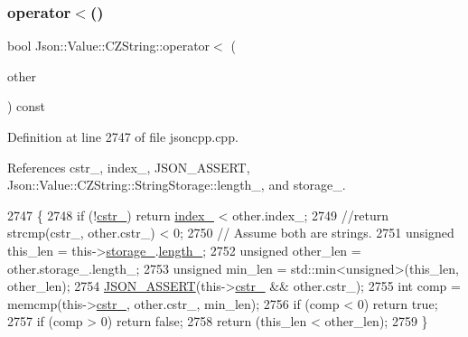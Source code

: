 \subsubsection{\texorpdfstring{operator$<$()}{operator<()}}
{\footnotesize\ttfamily bool Json\+::\+Value\+::\+C\+Z\+String\+::operator$<$ (\begin{DoxyParamCaption}\item[{\hyperlink{class_json_1_1_value_1_1_c_z_string}{C\+Z\+String} const \&}]{other }\end{DoxyParamCaption}) const}



Definition at line 2747 of file jsoncpp.\+cpp.



References cstr\+\_\+, index\+\_\+, J\+S\+O\+N\+\_\+\+A\+S\+S\+E\+RT, Json\+::\+Value\+::\+C\+Z\+String\+::\+String\+Storage\+::length\+\_\+, and storage\+\_\+.


\begin{DoxyCode}
2747                                                          \{
2748   \textcolor{keywordflow}{if} (!\hyperlink{class_json_1_1_value_1_1_c_z_string_a5b4d28349294034d7f779c3c95d0306c}{cstr\_}) \textcolor{keywordflow}{return} \hyperlink{class_json_1_1_value_1_1_c_z_string_aecf29982235c9c165a0971023ebbb270}{index\_} < other.index\_;
2749   \textcolor{comment}{//return strcmp(cstr\_, other.cstr\_) < 0;}
2750   \textcolor{comment}{// Assume both are strings.}
2751   \textcolor{keywordtype}{unsigned} this\_len = this->\hyperlink{class_json_1_1_value_1_1_c_z_string_a17c92f0f089a4314e3b1d5695dc1a851}{storage\_}.\hyperlink{struct_json_1_1_value_1_1_c_z_string_1_1_string_storage_a165d865c44e6471d34668eeb4f15b140}{length\_};
2752   \textcolor{keywordtype}{unsigned} other\_len = other.storage\_.length\_;
2753   \textcolor{keywordtype}{unsigned} min\_len = std::min<unsigned>(this\_len, other\_len);
2754   \hyperlink{json_8h_a188941dcc789ccb6539c3d6f41405582}{JSON\_ASSERT}(this->\hyperlink{class_json_1_1_value_1_1_c_z_string_a5b4d28349294034d7f779c3c95d0306c}{cstr\_} && other.cstr\_);
2755   \textcolor{keywordtype}{int} comp = memcmp(this->\hyperlink{class_json_1_1_value_1_1_c_z_string_a5b4d28349294034d7f779c3c95d0306c}{cstr\_}, other.cstr\_, min\_len);
2756   \textcolor{keywordflow}{if} (comp < 0) \textcolor{keywordflow}{return} \textcolor{keyword}{true};
2757   \textcolor{keywordflow}{if} (comp > 0) \textcolor{keywordflow}{return} \textcolor{keyword}{false};
2758   \textcolor{keywordflow}{return} (this\_len < other\_len);
2759 \}
\end{DoxyCode}
\mbox{\label{class_json_1_1_value_1_1_c_z_string_a6513ff431b0593d5744868dfee739f7b}} 
